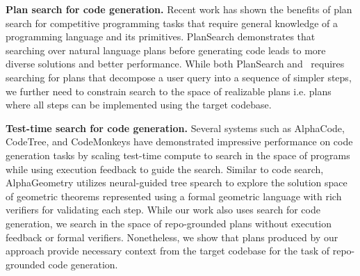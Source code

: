 \noindent\textbf{Plan search for code generation.} Recent work has shown the benefits of plan search for competitive programming tasks that require general knowledge of a programming language and its primitives. PlanSearch \cite{planning_improves_code_generation} demonstrates that searching over natural language plans before generating code leads to more diverse solutions and better performance. While both PlanSearch and \method~requires searching for plans that decompose a user query into a sequence of simpler steps, we further need to constrain search to the space of realizable plans i.e. plans where all steps can be implemented using the target codebase. 

\noindent\textbf{Test-time search for code generation.} Several systems such as AlphaCode\cite{alphacode}, CodeTree\cite{codetree}, and CodeMonkeys\cite{code_monkeys,large_language_monkeys} have demonstrated impressive performance on code generation tasks by scaling test-time compute to search in the space of programs while using execution feedback to guide the search. Similar to code search, AlphaGeometry\cite{alphageometry} utilizes neural-guided tree spearch to explore the solution space of geometric theorems represented using a formal geometric language with rich verifiers for validating each step. While our work also uses search for code generation, we search in the space of repo-grounded plans without execution feedback or formal verifiers. Nonetheless, we show that plans produced by our approach provide necessary context from the target codebase for the task of repo-grounded code generation.